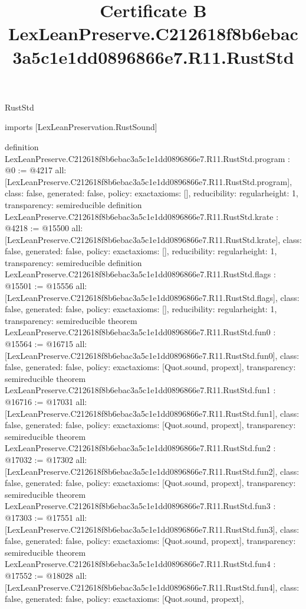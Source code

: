 \begin{lexlean}{RustStd}
\title{Certificate B LexLeanPreserve.C212618f8b6ebac3a5c1e1dd0896866e7.R11.RustStd}
\begin{coremodule}
imports [LexLeanPreservation.RustSound]

definition LexLeanPreserve.C212618f8b6ebac3a5c1e1dd0896866e7.R11.RustStd.program : @0 := @4217 {
  all: [LexLeanPreserve.C212618f8b6ebac3a5c1e1dd0896866e7.R11.RustStd.program],
  class: false,
  generated: false,
  policy: exact{axioms: []},
  reducibility: regular{height: 1},
  transparency: semireducible
}
definition LexLeanPreserve.C212618f8b6ebac3a5c1e1dd0896866e7.R11.RustStd.krate : @4218 := @15500 {
  all: [LexLeanPreserve.C212618f8b6ebac3a5c1e1dd0896866e7.R11.RustStd.krate],
  class: false,
  generated: false,
  policy: exact{axioms: []},
  reducibility: regular{height: 1},
  transparency: semireducible
}
definition LexLeanPreserve.C212618f8b6ebac3a5c1e1dd0896866e7.R11.RustStd.flags : @15501 := @15556 {
  all: [LexLeanPreserve.C212618f8b6ebac3a5c1e1dd0896866e7.R11.RustStd.flags],
  class: false,
  generated: false,
  policy: exact{axioms: []},
  reducibility: regular{height: 1},
  transparency: semireducible
}
theorem LexLeanPreserve.C212618f8b6ebac3a5c1e1dd0896866e7.R11.RustStd.fun0 : @15564 := @16715 {
  all: [LexLeanPreserve.C212618f8b6ebac3a5c1e1dd0896866e7.R11.RustStd.fun0],
  class: false,
  generated: false,
  policy: exact{axioms: [Quot.sound, propext]},
  transparency: semireducible
}
theorem LexLeanPreserve.C212618f8b6ebac3a5c1e1dd0896866e7.R11.RustStd.fun1 : @16716 := @17031 {
  all: [LexLeanPreserve.C212618f8b6ebac3a5c1e1dd0896866e7.R11.RustStd.fun1],
  class: false,
  generated: false,
  policy: exact{axioms: [Quot.sound, propext]},
  transparency: semireducible
}
theorem LexLeanPreserve.C212618f8b6ebac3a5c1e1dd0896866e7.R11.RustStd.fun2 : @17032 := @17302 {
  all: [LexLeanPreserve.C212618f8b6ebac3a5c1e1dd0896866e7.R11.RustStd.fun2],
  class: false,
  generated: false,
  policy: exact{axioms: [Quot.sound, propext]},
  transparency: semireducible
}
theorem LexLeanPreserve.C212618f8b6ebac3a5c1e1dd0896866e7.R11.RustStd.fun3 : @17303 := @17551 {
  all: [LexLeanPreserve.C212618f8b6ebac3a5c1e1dd0896866e7.R11.RustStd.fun3],
  class: false,
  generated: false,
  policy: exact{axioms: [Quot.sound, propext]},
  transparency: semireducible
}
theorem LexLeanPreserve.C212618f8b6ebac3a5c1e1dd0896866e7.R11.RustStd.fun4 : @17552 := @18028 {
  all: [LexLeanPreserve.C212618f8b6ebac3a5c1e1dd0896866e7.R11.RustStd.fun4],
  class: false,
  generated: false,
  policy: exact{axioms: [Quot.sound, propext]},
}
\end{coremodule}
\end{lexlean}
